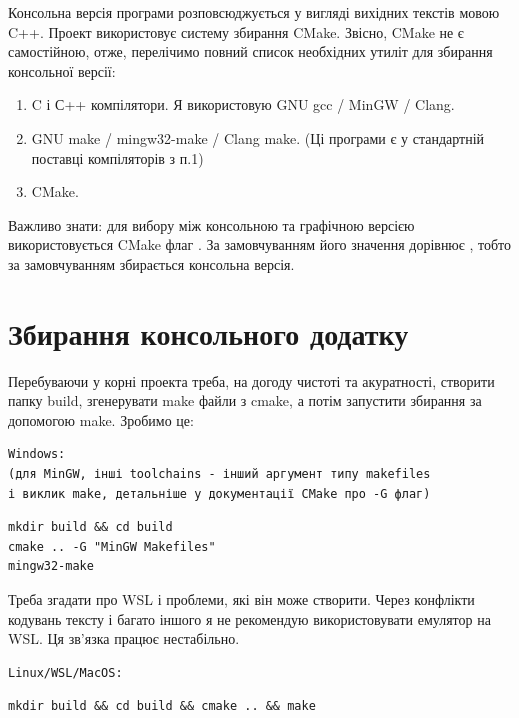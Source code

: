 \documentclass[oneside,final,14pt]{extreport}
\begin{document}
 Консольна версія програми розповсюджується у вигляді вихідних текстів мовою C++. Проект використовує систему збирання CMake.
 Звісно, CMake не є самостійною, отже, перелічимо повний список необхідних утиліт для збирання консольної версії:
  
 \begin{enumerate} 
  \item C і С++ компілятори. Я використовую GNU gcc / MinGW / Clang.
  \item  GNU make / mingw32-make / Clang make. (Ці програми є у стандартній поставці компіляторів з п.1)
  \item CMake.
\end{enumerate}
  
Важливо знати: для вибору між консольною та графічною версією використовується CMake флаг . За замовчуванням його значення дорівнює , тобто за замовчуванням збирається консольна версія.

\section{Збирання консольного додатку}
Перебуваючи у корні проекта треба, на догоду чистоті та акуратності, створити папку build, згенерувати make файли з cmake, а потім запустити збирання за допомогою make.
Зробимо це:
\begin{verbatim}
Windows:
(для MinGW, інші toolchains - інший аргумент типу makefiles 
і виклик make, детальніше у документації CMake про -G флаг)
\end{verbatim}
\begin{tcolorbox}
\begin{verbatim}
mkdir build && cd build
cmake .. -G "MinGW Makefiles"
mingw32-make
\end{verbatim}
\end{tcolorbox}

Треба згадати про WSL і проблеми, які він може створити. Через конфлікти кодувань тексту і багато іншого я не рекомендую використовувати емулятор на WSL. Ця зв'язка працює нестабільно.

\begin{verbatim}
Linux/WSL/MacOS:
\end{verbatim}
\begin{tcolorbox}
\begin{verbatim}
mkdir build && cd build && cmake .. && make
\end{verbatim}
\end{tcolorbox}
\end{document}
